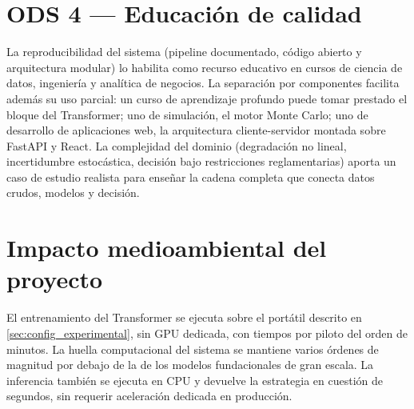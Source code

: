 \section*{ODS 4 — Educación de calidad}

La reproducibilidad del sistema (pipeline documentado, código abierto y arquitectura modular) lo habilita como recurso educativo en cursos de ciencia de datos, ingeniería y analítica de negocios. La separación por componentes facilita además su uso parcial: un curso de aprendizaje profundo puede tomar prestado el bloque del Transformer; uno de simulación, el motor Monte Carlo; uno de desarrollo de aplicaciones web, la arquitectura cliente-servidor montada sobre FastAPI y React. La complejidad del dominio (degradación no lineal, incertidumbre estocástica, decisión bajo restricciones reglamentarias) aporta un caso de estudio realista para enseñar la cadena completa que conecta datos crudos, modelos y decisión.

\section*{Impacto medioambiental del proyecto}

El entrenamiento del Transformer se ejecuta sobre el portátil descrito en \ref{sec:config_experimental}, sin GPU dedicada, con tiempos por piloto del orden de minutos. La huella computacional del sistema se mantiene varios órdenes de magnitud por debajo de la de los modelos fundacionales de gran escala. La inferencia también se ejecuta en CPU y devuelve la estrategia en cuestión de segundos, sin requerir aceleración dedicada en producción.
